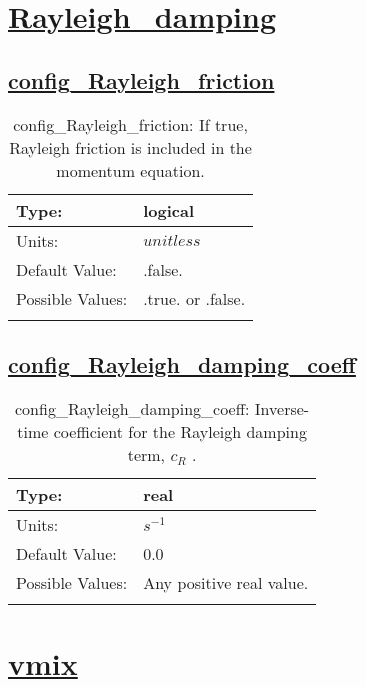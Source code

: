 \section[Rayleigh\_damping]{\hyperref[sec:nm_tab_Rayleigh_damping]{Rayleigh\_damping}}
\label{sec:nm_sec_Rayleigh_damping}
\subsection[config\_Rayleigh\_friction]{\hyperref[sec:nm_tab_Rayleigh_damping]{config\_Rayleigh\_friction}}
\label{subsec:nm_sec_config_Rayleigh_friction}
\begin{center}
\begin{longtable}{| p{2.0in} | p{4.0in} |}
    \hline
    Type: & logical \\
    \hline
    Units: & $unitless$ \\
    \hline
    Default Value: & .false. \\
    \hline
    Possible Values: & .true. or .false. \\
    \hline
    \caption{config\_Rayleigh\_friction: If true, Rayleigh friction is included in the momentum equation.}
\end{longtable}
\end{center}
\subsection[config\_Rayleigh\_damping\_coeff]{\hyperref[sec:nm_tab_Rayleigh_damping]{config\_Rayleigh\_damping\_coeff}}
\label{subsec:nm_sec_config_Rayleigh_damping_coeff}
\begin{center}
\begin{longtable}{| p{2.0in} | p{4.0in} |}
    \hline
    Type: & real \\
    \hline
    Units: & $s^{-1}$ \\
    \hline
    Default Value: & 0.0 \\
    \hline
    Possible Values: & Any positive real value. \\
    \hline
    \caption{config\_Rayleigh\_damping\_coeff:  Inverse-time coefficient for the Rayleigh damping term,  $c_R$ .}
\end{longtable}
\end{center}
\section[vmix]{\hyperref[sec:nm_tab_vmix]{vmix}}
\label{sec:nm_sec_vmix}
